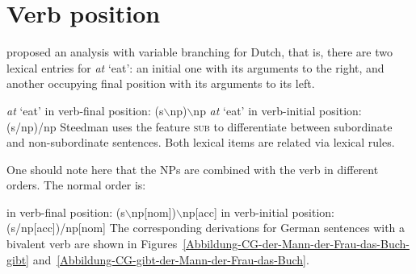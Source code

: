 \section{Verb position}
\label{sec-Verbstellung-CG-Steedman}

\mbox{}\citet[]{Steedman2000a-u} proposed an analysis with variable branching for Dutch, that is, there are two lexical entries for 
 \emph{at} `eat': an initial one with its arguments to the right, and another occupying final position with its arguments to its left.

\eal
\ex \emph{at} `eat' in verb-final position: (s$\backslash$np)$\backslash$np
\ex \emph{at} `eat' in verb-initial position: (s/np)/np
\zl
Steedman uses the feature \textsc{sub} to differentiate between subordinate and non-subordinate sentences. Both lexical items are related via lexical rules.

One should note here that the NPs are combined with the verb in different orders. The normal order is:

\eal
\label{CG-Verbbewegung}
\ex in verb-final position: (s$\backslash$np[nom])$\backslash$np[acc]
\ex in verb-initial position: (s/np[acc])/np[nom]
\zl
\largerpage[2]
The corresponding derivations for German sentences with a bivalent verb are shown in Figures~\ref{Abbildung-CG-der-Mann-der-Frau-das-Buch-gibt}
and~\ref{Abbildung-CG-gibt-der-Mann-der-Frau-das-Buch}.

